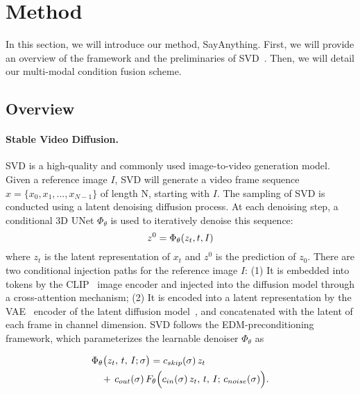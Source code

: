 

\section{Method}
In this section, we will introduce our method, SayAnything. First, we will provide an overview of the framework and the preliminaries of SVD~\citep{blattmann2023stable}. Then, we will detail our multi-modal condition fusion scheme.


\subsection{Overview}

\paragraph{Stable Video Diffusion.} SVD is a high-quality and commonly used image-to-video generation model. Given a reference image $I$, SVD will generate a video frame sequence $x = \{x_0, x_1, ..., x_{N-1}\}$ of length N, starting with $I$. The sampling of SVD is conducted using a latent denoising diffusion process. At each denoising step, a conditional 3D UNet $\Phi_\theta$ is used to iteratively denoise this sequence:
\begin{equation}
\setlength{\abovedisplayskip}{3pt}
z^0 = \Phi_\theta(z_t, t, I)
\setlength{\belowdisplayskip}{3pt}
\end{equation}
where $z_t$ is the latent representation of $x_t$ and $z^0$ is the prediction of $z_0$. There are two conditional injection paths for the reference image $I$: (1) It is embedded into tokens by the CLIP~\citep{radford2021learning} image encoder and injected into the diffusion model through a cross-attention mechanism; (2) It is encoded into a latent representation by the VAE~\citep{kingma2013auto} encoder of the latent diffusion model~\citep{rombach2022high}, and concatenated with the latent of each frame in channel dimension.
SVD follows the EDM-preconditioning~\citep{karras2022elucidating} framework, which parameterizes the learnable denoiser 
\(\Phi_\theta\) as
\begin{small}
\begin{align}
\setlength{\abovedisplayskip}{0pt}
& \Phi_\theta\bigl(z_t,\,t,\,I;\sigma\bigr) 
= c_{skip}(\sigma)\,z_t \\
\nonumber
&\quad +\, c_{out}(\sigma)\,
F_\theta\Bigl(
  c_{in}(\sigma)\,z_t,\,
  t,\,
  I;\,
  c_{noise}(\sigma)
\Bigr).
\label{eq:edm_param}
\setlength{\belowdisplayskip}{0pt}
\end{align}
\end{small}
